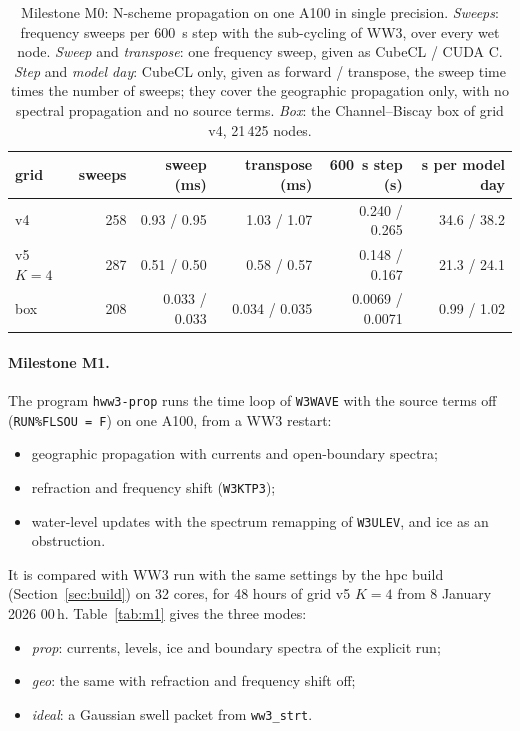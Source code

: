 \documentclass[11pt,a4paper]{article}
\begin{document}
\begin{table}[H]
\centering\small
\begin{tabular}{lrrrrr}
\toprule
grid & sweeps & sweep (ms) & transpose (ms) & \SI{600}{s} step (s) & s per model day \\
\midrule
v4 & 258 & 0.93 / 0.95 & 1.03 / 1.07 & 0.240 / 0.265 & 34.6 / 38.2 \\
v5 $K=4$ & 287 & 0.51 / 0.50 & 0.58 / 0.57 & 0.148 / 0.167 & 21.3 / 24.1 \\
box & 208 & 0.033 / 0.033 & 0.034 / 0.035 & 0.0069 / 0.0071 & 0.99 / 1.02 \\
\bottomrule
\end{tabular}
\caption{Milestone M0: N-scheme propagation on one A100 in single
precision.
\emph{Sweeps}: frequency sweeps per \SI{600}{s} step with the sub-cycling
of WW3, over every wet node.
\emph{Sweep} and \emph{transpose}: one frequency sweep, given as CubeCL /
CUDA C.
\emph{Step} and \emph{model day}: CubeCL only, given as forward /
transpose, the sweep time times the number of sweeps; they cover the
geographic propagation only, with no spectral propagation and no source
terms.
\emph{Box}: the Channel--Biscay box of grid v4, 21\,425 nodes.}
\label{tab:m0}
\end{table}

\paragraph{Milestone M1.} The program \texttt{hww3-prop} runs the time loop
of \texttt{W3WAVE} with the source terms off (\texttt{RUN\%FLSOU = F}) on
one A100, from a WW3 restart:
\begin{itemize}
\item geographic propagation with currents and open-boundary spectra;
\item refraction and frequency shift (\texttt{W3KTP3});
\item water-level updates with the spectrum remapping of \texttt{W3ULEV}, and
ice as an obstruction.
\end{itemize}
It is compared with WW3 run with the same settings by the hpc build
(Section~\ref{sec:build}) on 32 cores, for 48 hours of grid v5 $K=4$ from
8 January 2026 00\,h. Table~\ref{tab:m1} gives the three modes:
\begin{itemize}
\item \emph{prop}: currents, levels, ice and boundary spectra of the
explicit run;
\item \emph{geo}: the same with refraction and frequency shift off;
\item \emph{ideal}: a Gaussian swell packet from \texttt{ww3\_strt}.
\end{itemize}
\end{document}
